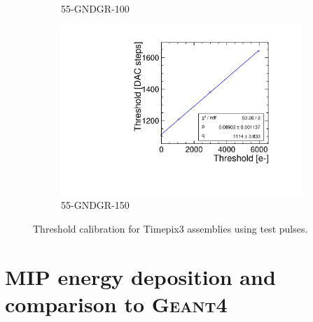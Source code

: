 \begin{figure}[htbp]
\begin{subfigure}[b]{0.45\textwidth}
    \caption{55-GNDGR-100}
  \end{subfigure} \hfill
  \begin{subfigure}[b]{0.45\textwidth}
    \includegraphics[width=\textwidth]{./figures/Calibration/THLcalibration_W0005_F01.pdf}
    \caption{55-GNDGR-150}
  \end{subfigure}
  \caption{Threshold calibration for Timepix3 assemblies using test pulses.}
  \label{fig:Timepix3_THL_Calibration}
\end{figure}




\section{MIP energy deposition and comparison to \textsc{Geant4}}


